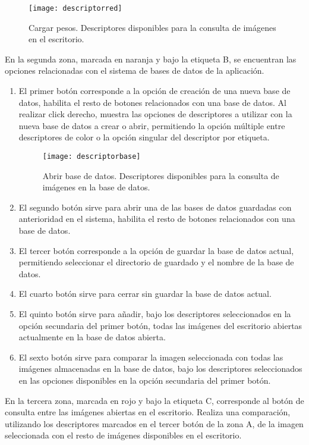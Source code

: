 \begin{figure}[h]
  \centering
  \texttt{[image: descriptorred]}
  \caption{Cargar pesos. Descriptores disponibles para la consulta de imágenes en el escritorio.}
  \label{fig:descriptorred}
\end{figure}

En la segunda zona, marcada en naranja y bajo la etiqueta B, se encuentran las opciones relacionadas con el sistema de bases de datos de la aplicación.

\begin{enumerate}
\item El primer botón corresponde a la opción de creación de una nueva base de datos, habilita el resto de botones relacionados con una base de datos. Al realizar click derecho, muestra las opciones de descriptores a utilizar con la nueva base de datos a crear o abrir, permitiendo la opción múltiple entre descriptores de color o la opción singular del descriptor por etiqueta.
\begin{figure}[h]
  \centering
  \texttt{[image: descriptorbase]}
  \caption{Abrir base de datos. Descriptores disponibles para la consulta de imágenes en la base de datos.}
  \label{fig:descriptorbase}
\end{figure}
\item El segundo botón sirve para abrir una de las bases de datos guardadas con anterioridad en el sistema, habilita el resto de botones relacionados con una base de datos.
\item El tercer botón corresponde a la opción de guardar la base de datos actual, permitiendo seleccionar el directorio de guardado y el nombre de la base de datos.
\item El cuarto botón sirve para cerrar sin guardar la base de datos actual.
\item El quinto botón sirve para añadir, bajo los descriptores seleccionados en la opción secundaria del primer botón, todas las imágenes del escritorio abiertas actualmente en la base de datos abierta.
\item El sexto botón sirve para comparar la imagen seleccionada con todas las imágenes almacenadas en la base de datos, bajo los descriptores seleccionados en las opciones disponibles en la opción secundaria del primer botón.
\end{enumerate}

En la tercera zona, marcada en rojo y bajo la etiqueta C, corresponde al botón de consulta entre las imágenes abiertas en el escritorio. Realiza una comparación, utilizando los descriptores marcados en el tercer botón de la zona A, de la imagen seleccionada con el resto de imágenes disponibles en el escritorio.\\

